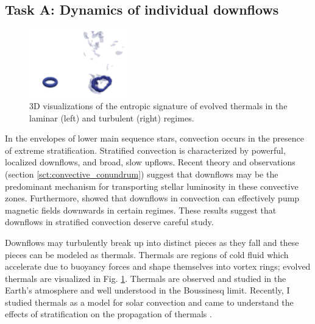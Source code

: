 \documentclass[aasms,11pt]{article}
\begin{document}
\subsection{Task A: Dynamics of individual downflows}
\label{sct:taskA}
\begin{figure}
	\begin{center}
	\vspace{-10pt}
    \includegraphics[width=0.38\textwidth]{./figs/thermals_comparison.png}
	\vspace{-15pt}
	\end{center}
    \caption{
	3D visualizations of the entropic signature of evolved thermals in the laminar (left) and turbulent (right) regimes.
	\label{fig:thermals_comparison} }
\end{figure}

In the envelopes of lower main sequence stars, convection occurs in the presence of extreme stratification.
Stratified convection is characterized by powerful, localized downflows, and broad, slow upflows.
Recent theory and observations (section \ref{sct:convective_conundrum}) suggest that downflows may be the predominant mechanism for transporting stellar luminosity in these convective zones.
Furthermore, \citet{tobias&all1998} showed that downflows in convection can effectively pump magnetic fields downwards in certain regimes.
These results suggest that downflows in stratified convection deserve careful study.

Downflows may turbulently break up into distinct pieces as they fall and these pieces can be modeled as thermals.
Thermals are regions of cold fluid which accelerate due to buoyancy forces and shape themselves into vortex rings; evolved thermals are visualized in Fig. \ref{fig:thermals_comparison}.
Thermals are observed and studied in the Earth's atmosphere and well understood in the Boussinesq limit.
Recently, I studied thermals as a model for solar convection and came to understand the effects of stratification on the propagation of thermals \citep{andersLB2019}.
\end{document}
